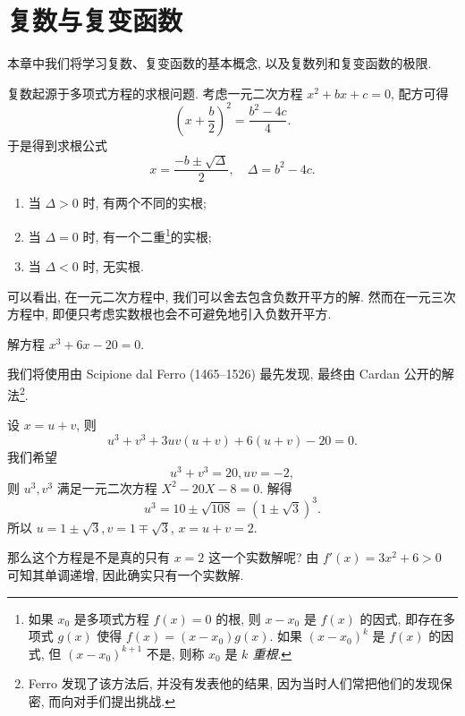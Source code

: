 
\chapter{复数与复变函数}

本章中我们将学习复数、复变函数的基本概念, 以及复数列和复变函数的极限.

复数起源于多项式方程的求根问题. 
考虑一元二次方程 $x^2+bx+c=0$, 配方可得
  \[\left(x+\frac b2\right)^2=\frac{b^2-4c}4.\]
于是得到求根公式
  \[x=\frac{-b\pm\sqrt\Delta}2,\quad \Delta=b^2-4c.\]
\begin{enumerate}
  \item 当 $\Delta>0$ 时, 有两个不同的实根;
  \item 当 $\Delta=0$ 时, 有一个二重\footnote{如果 $x_0$ 是多项式方程 $f(x)=0$ 的根, 则 $x-x_0$ 是 $f(x)$ 的因式, 即存在多项式 $g(x)$ 使得 $f(x)=(x-x_0)g(x)$.
  如果 $(x-x_0)^k$ 是 $f(x)$ 的因式, 但 $(x-x_0)^{k+1}$ 不是, 则称 $x_0$ 是 \emph{$k$ 重根}.}的实根;
  \item 当 $\Delta<0$ 时, 无实根.
\end{enumerate}

可以看出, 在一元二次方程中, 我们可以舍去包含\alert{负数开平方}的解. 然而在一元三次方程中, 即便只考虑实数根也会不可避免地引入负数开平方.

\begin{example}
  解方程 $x^3+6x-20=0$.
\end{example}
我们将使用由 Scipione dal Ferro (1465--1526) 最先发现, 最终由 Cardan 公开的解法\footnote{Ferro 发现了该方法后, 并没有发表他的结果, 因为当时人们常把他们的发现保密, 而向对手们提出挑战.}.
\begin{solution}
  设 $x=u+v$, 则
    \[u^3+v^3+3uv(u+v)+6(u+v)-20=0.\]
  我们希望
    \[u^3+v^3=20, uv=-2,\]
  则 $u^3,v^3$ 满足一元二次方程 $X^2-20X-8=0$.
  解得
    \[u^3=10\pm\sqrt{108}{=(1\pm\sqrt3)^3.}\]
  所以 $u=1\pm\sqrt3, v=1\mp\sqrt 3$, $x=u+v=2$.
\end{solution}

那么这个方程是不是真的只有 $x=2$ 这一个实数解呢?
由 $f'(x)=3x^2+6>0$ 可知其单调递增, 因此确实只有一个实数解.


